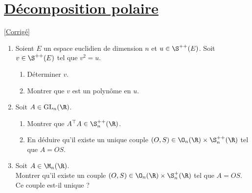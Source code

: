 \documentclass[8pt]{book}
\begin{document}
\section{\underline{Décomposition polaire} }
\label{Décomposition polaire}
\textcolor{blue}{\hyperref[Décomposition polaire corrigé]{[Corrigé]}}\\
\begin{enumerate}[leftmargin=*]
	\item Soient $E$ un espace euclidien de dimension $n$ et $u\in \S^{++}(E)$. Soit $v\in \S^{++}(E)$ tel que $v^2=u$.
	\begin{enumerate}[label=\alph*.]
		\item Déterminer $v$.
		\item Montrer que $v$ est un polynôme en $u$.
	\end{enumerate}
	\item Soit $A\in \text{GL}_n(\R)$.
	\begin{enumerate}[label=\alph*.]
		\item Montrer que $A^\top A\in \S^{++}_n(\R)$.
		\item En déduire qu'il existe un unique couple $(O,S)\in \O_n(\R)\times \S^{++}_n(\R)$ tel que $A=OS$.
	\end{enumerate}
	\item Soit $A\in \M_n(\R)$.\\
	Montrer qu'il existe un couple $(O,S)\in \O_n(\R)\times \S^+_n(\R)$ tel que $A=OS$. Ce couple est-il unique ?
\end{enumerate}
\end{document}
